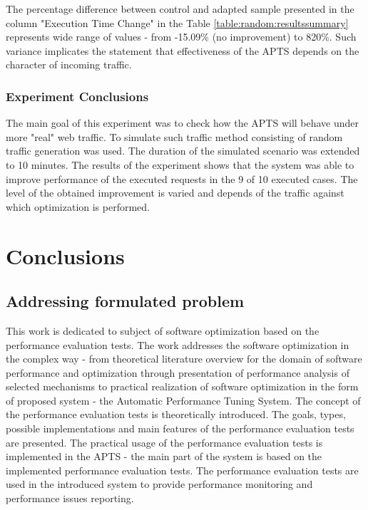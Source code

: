 \documentclass[12pt,a4paper]{article}
\begin{document}
The percentage difference between control and adapted sample presented in the column "Execution Time Change" in the Table \ref{table:random:resultssummary} represents wide range of values - from -15.09\% (no improvement) to 820\%. Such variance implicates the statement that effectiveness of the APTS depends on the character of incoming traffic.  


\subsubsection{Experiment Conclusions}

The main goal of this experiment was to check how the APTS will behave under more "real" web traffic. To simulate such traffic method consisting of random traffic generation was used. The duration of the simulated scenario was extended to 10 minutes. The results of the experiment shows that the system was able to improve performance of the executed requests in the 9 of 10 executed cases. The level of the obtained improvement is varied and depends of the traffic against which optimization is performed.


\section{Conclusions} \label{section:conclusions}

\subsection{Addressing formulated problem}

This work is dedicated to subject of software optimization based on the performance evaluation tests. The work addresses the software optimization in the complex way - from theoretical literature overview for the domain of software performance and optimization through presentation of performance analysis of selected mechanisms to practical realization of software optimization in the form of proposed system - the Automatic Performance Tuning System. The concept of the performance evaluation tests is theoretically introduced. The goals, types, possible implementations and main features of the performance evaluation tests are presented. The practical usage of the performance evaluation tests is implemented in the APTS - the main part of the system is based on the implemented performance evaluation tests. The performance evaluation tests are used in the introduced system to provide performance monitoring and performance issues reporting.
\end{document}
